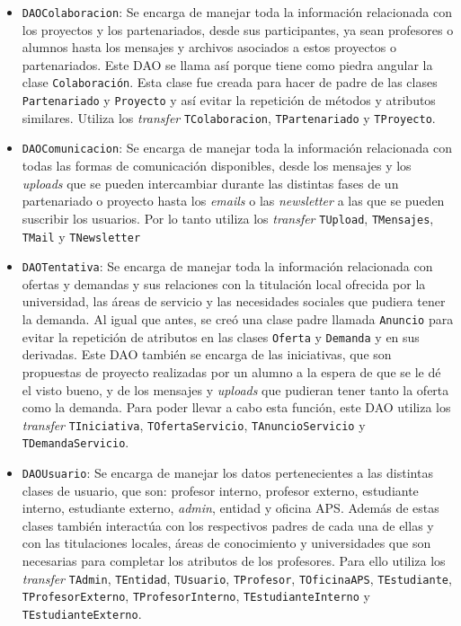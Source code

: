 \documentclass[11pt]{article}
\begin{document}
\begin{itemize}
	\item \texttt{DAOColaboracion}: Se encarga de manejar toda la información relacionada con los proyectos y los partenariados, desde sus participantes, ya sean profesores o alumnos hasta los mensajes y archivos asociados a estos proyectos o partenariados. Este DAO se llama así porque tiene como piedra angular la clase \texttt{Colaboración}.
	Esta clase fue creada para hacer de padre de las clases \texttt{Partenariado} y \texttt{Proyecto} y así evitar la repetición de métodos y atributos similares. Utiliza los \emph{transfer} \texttt{TColaboracion}, \texttt{TPartenariado} y \texttt{TProyecto}.

	\item \texttt{DAOComunicacion}: Se encarga de manejar toda la información relacionada con todas las formas de comunicación disponibles, desde los mensajes y los \emph{uploads} que se pueden intercambiar durante las distintas fases de un partenariado o proyecto hasta los \emph{emails} o las \emph{newsletter} a las que se pueden suscribir los usuarios. Por lo tanto utiliza los \emph{transfer} \texttt{TUpload}, \texttt{TMensajes}, \texttt{TMail} y \texttt{TNewsletter}

	\item \texttt{DAOTentativa}: Se encarga de manejar toda la información relacionada con ofertas y demandas y sus relaciones con la titulación local ofrecida por la universidad, las áreas de servicio y las necesidades sociales que pudiera tener la demanda. 
	Al igual que antes, se creó una clase padre llamada \texttt{Anuncio} para evitar la repetición de atributos en las clases \texttt{Oferta} y \texttt{Demanda} y en sus derivadas. Este DAO también se encarga de las iniciativas, que son propuestas de proyecto realizadas por un alumno a la espera de que se le dé el visto bueno, y de los mensajes y \emph{uploads} que pudieran tener tanto la oferta como la demanda. Para poder llevar a cabo esta función, este DAO utiliza los \emph{transfer} \texttt{TIniciativa}, \texttt{TOfertaServicio}, \texttt{TAnuncioServicio} y \texttt{TDemandaServicio}.

	\item \texttt{DAOUsuario}: Se encarga de manejar los datos pertenecientes a las distintas clases de usuario, que son: profesor interno, profesor externo, estudiante interno, estudiante externo, \emph{admin}, entidad y oficina APS.
	Además de estas clases también interactúa con los respectivos padres de cada una de ellas y con las titulaciones locales, áreas de conocimiento y universidades que son necesarias para completar los atributos de los profesores.
	Para ello utiliza los \emph{transfer} \texttt{TAdmin}, \texttt{TEntidad}, \texttt{TUsuario}, \texttt{TProfesor}, \texttt{TOficinaAPS}, \texttt{TEstudiante}, \texttt{TProfesorExterno}, \texttt{TProfesorInterno}, \texttt{TEstudianteInterno} y \texttt{TEstudianteExterno}.

	
	\end{itemize}
\end{document}
